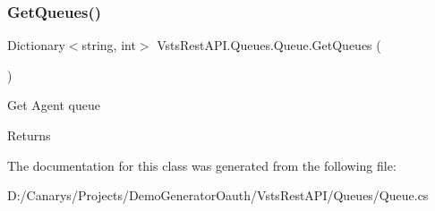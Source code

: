 \subsubsection{\texorpdfstring{Get\+Queues()}{GetQueues()}}
{\footnotesize\ttfamily Dictionary$<$string, int$>$ Vsts\+Rest\+A\+P\+I.\+Queues.\+Queue.\+Get\+Queues (\begin{DoxyParamCaption}{ }\end{DoxyParamCaption})}



Get Agent queue 

\begin{DoxyReturn}{Returns}

\end{DoxyReturn}


The documentation for this class was generated from the following file\+:\begin{DoxyCompactItemize}
\item 
D\+:/\+Canarys/\+Projects/\+Demo\+Generator\+Oauth/\+Vsts\+Rest\+A\+P\+I/\+Queues/Queue.\+cs\end{DoxyCompactItemize}
